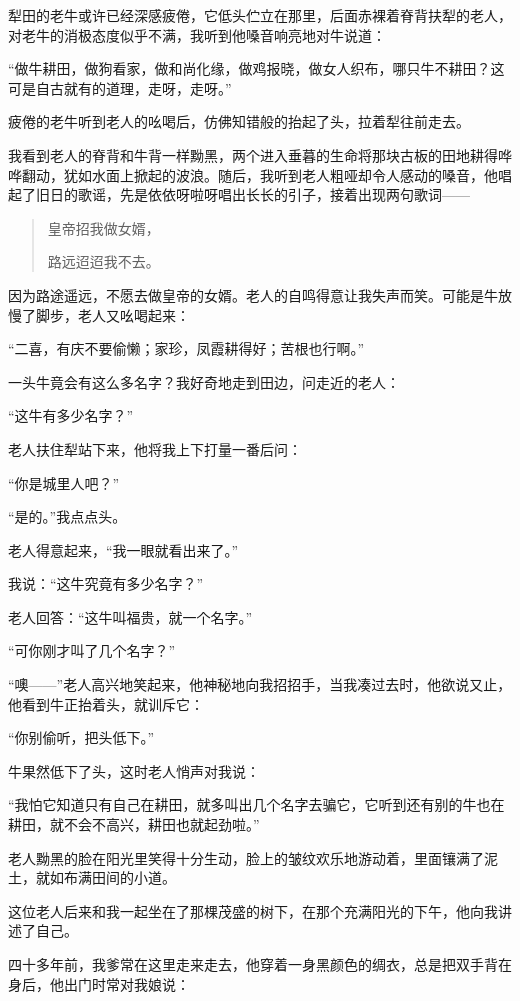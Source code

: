 \documentclass[12pt,UTF8]{ctexbook}
\begin{document}
犁田的老牛或许已经深感疲倦，它低头伫立在那里，后面赤裸着脊背扶犁的老人，对老牛的消极态度似乎不满，我听到他嗓音响亮地对牛说道：

“做牛耕田，做狗看家，做和尚化缘，做鸡报晓，做女人织布，哪只牛不耕田？这可是自古就有的道理，走呀，走呀。”

疲倦的老牛听到老人的吆喝后，仿佛知错般的抬起了头，拉着犁往前走去。

我看到老人的脊背和牛背一样黝黑，两个进入垂暮的生命将那块古板的田地耕得哗哗翻动，犹如水面上掀起的波浪。随后，我听到老人粗哑却令人感动的嗓音，他唱起了旧日的歌谣，先是依依呀啦呀唱出长长的引子，接着出现两句歌词——

\begin{quotation}
皇帝招我做女婿，

路远迢迢我不去。
\end{quotation}

因为路途遥远，不愿去做皇帝的女婿。老人的自鸣得意让我失声而笑。可能是牛放慢了脚步，老人又吆喝起来：

“二喜，有庆不要偷懒；家珍，凤霞耕得好；苦根也行啊。”

一头牛竟会有这么多名字？我好奇地走到田边，问走近的老人：

“这牛有多少名字？”

老人扶住犁站下来，他将我上下打量一番后问：

“你是城里人吧？”

“是的。”我点点头。

老人得意起来，“我一眼就看出来了。”

我说：“这牛究竟有多少名字？”

老人回答：“这牛叫福贵，就一个名字。”

“可你刚才叫了几个名字？”

“噢——”老人高兴地笑起来，他神秘地向我招招手，当我凑过去时，他欲说又止，他看到牛正抬着头，就训斥它：

“你别偷听，把头低下。”

牛果然低下了头，这时老人悄声对我说：

“我怕它知道只有自己在耕田，就多叫出几个名字去骗它，它听到还有别的牛也在耕田，就不会不高兴，耕田也就起劲啦。”

老人黝黑的脸在阳光里笑得十分生动，脸上的皱纹欢乐地游动着，里面镶满了泥土，就如布满田间的小道。

这位老人后来和我一起坐在了那棵茂盛的树下，在那个充满阳光的下午，他向我讲述了自己。

四十多年前，我爹常在这里走来走去，他穿着一身黑颜色的绸衣，总是把双手背在身后，他出门时常对我娘说：
\end{document}
